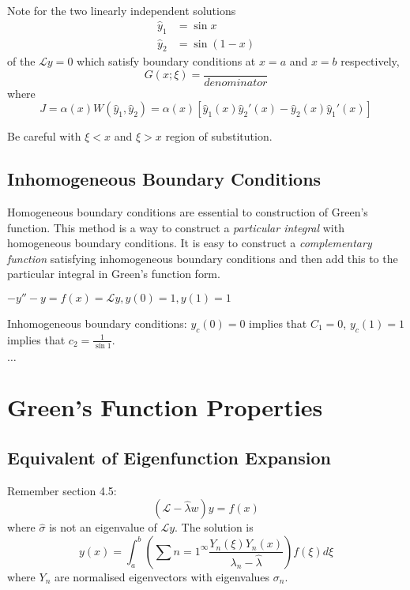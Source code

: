 \documentclass[a4paper]{article}
\renewcommand*{\L}{\mathcal{L}}
\begin{document}
Note for the two linearly independent solutions
\begin{align*}
  \hat y_1 &= \sin x \\
  \hat y_2 &= \sin (1 - x)
\end{align*}
of the \(\L y = 0\) which satisfy boundary conditions at \(x = a\) and \(x = b\) respectively,
\[
  G(x; \xi) = \frac{}{denominator}
\]
where
\[
  J = \alpha(x) W(\hat y_1, \hat y_2) = \alpha(x) [\hat y_1(x) \hat y_2'(x) - \hat y_2(x) \hat y_1'(x) ]
\]

\begin{note}
  Be careful with \(\xi < x\) and \(\xi > x\) region of substitution.
\end{note}

\subsection{Inhomogeneous Boundary Conditions}

Homogeneous boundary conditions are essential to construction of Green's function. This method is a way to construct a \emph{particular integral} with homogeneous boundary conditions. It is easy to construct a \emph{complementary function} satisfying inhomogeneous boundary conditions and then add this to the particular integral in Green's function form.

\begin{eg}
  \(-y'' - y = f(x) = \L y, y(0) = 1, y(1) = 1\)

  Inhomogeneous boundary conditions: \(y_c(0) = 0\) implies that \(C_1 = 0\), \(y_c(1) = 1\) implies that \(c_2 = \frac{1}{\sin 1}\).

   \(\dots\)
\end{eg}

\section{Green's Function Properties}

\subsection{Equivalent of Eigenfunction Expansion}

Remember section 4.5:
\[
  (\L - \hat \lambda w) y = f(x)
\]
where \(\hat \sigma\) is not an eigenvalue of \(\L y\). The solution is
\[
  y(x) = \int_{a}^{b} \left( \sum{n = 1}^\infty \frac{Y_n(\xi)Y_n(x)}{\lambda_n - \hat \lambda} \right) f(\xi) d\xi
\]
where \(Y_n\) are normalised eigenvectors with eigenvalues \(\sigma_n\).
\end{document}
